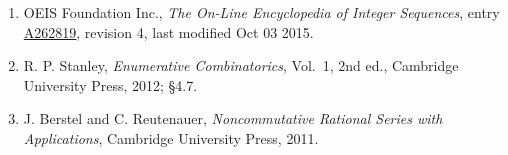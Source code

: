 \documentclass[11pt]{article}
\theoremstyle{definition}
\begin{document}
\begin{enumerate}

\item OEIS Foundation Inc., \emph{The On-Line Encyclopedia of Integer Sequences}, entry \href{https://oeis.org/A262819}{A262819}, revision 4, last modified Oct 03 2015.

\item R. P. Stanley, \emph{Enumerative Combinatorics}, Vol.~1, 2nd ed., Cambridge University Press, 2012; \S4.7.

\item J. Berstel and C. Reutenauer, \emph{Noncommutative Rational Series with Applications}, Cambridge University Press, 2011.

\end{enumerate}
\end{document}
